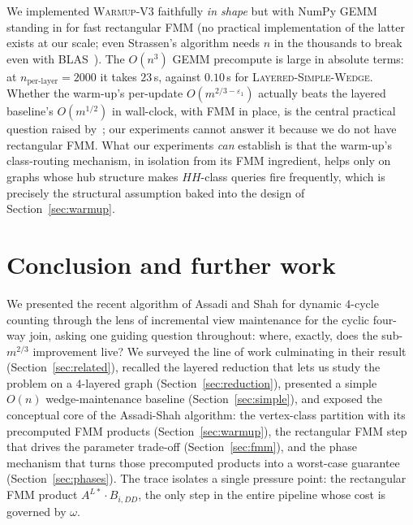 \documentclass[sigconf,nonacm]{acmart}
\theoremstyle{plain}
\theoremstyle{definition}
\begin{document}
We implemented \textsc{Warmup-V3} faithfully \emph{in shape} but with
NumPy GEMM standing in for fast rectangular FMM (no practical
implementation of the latter exists at our scale; even Strassen's
algorithm needs $n$ in the thousands to break even with
BLAS~\cite{ADW25}). The $O(n^3)$ GEMM precompute is large in absolute
terms: at $n_{\text{per-layer}} = 2000$ it takes $23$\,s, against
$0.10$\,s for \textsc{Layered-Simple-Wedge}. Whether the warm-up's
per-update $O(m^{2/3 - \varepsilon_1})$ actually beats the layered
baseline's $O(m^{1/2})$ in wall-clock, with FMM in place, is the
central practical question raised by~\cite{AssadiShah25}; our
experiments cannot answer it because we do not have rectangular FMM.
What our experiments \emph{can} establish is that the warm-up's
class-routing mechanism, in isolation from its FMM ingredient, helps
only on graphs whose hub structure makes $HH$-class queries fire
frequently, which is precisely the structural assumption baked
into the design of Section~\ref{sec:warmup}.

\section{Conclusion and further work}
\label{sec:conclusion}

We presented the recent algorithm of Assadi and Shah for
dynamic $4$-cycle counting through the lens of incremental view
maintenance for the cyclic four-way join, asking one guiding
question throughout: where, exactly, does the sub-$m^{2/3}$
improvement live? We surveyed the line of work culminating in
their result (Section~\ref{sec:related}), recalled the layered
reduction that lets us study the problem on a $4$-layered graph
(Section~\ref{sec:reduction}), presented a simple $O(n)$
wedge-maintenance baseline (Section~\ref{sec:simple}), and exposed
the conceptual core of the Assadi-Shah algorithm: the vertex-class
partition with its precomputed FMM products
(Section~\ref{sec:warmup}), the rectangular FMM step that drives
the parameter trade-off (Section~\ref{sec:fmm}), and the phase
mechanism that turns those precomputed products into a worst-case
guarantee (Section~\ref{sec:phases}). The trace isolates a single
pressure point: the rectangular FMM product
$A^{L*}\!\cdot\!B_{i,DD}$, the only step in the entire pipeline
whose cost is governed by $\omega$.
\end{document}

